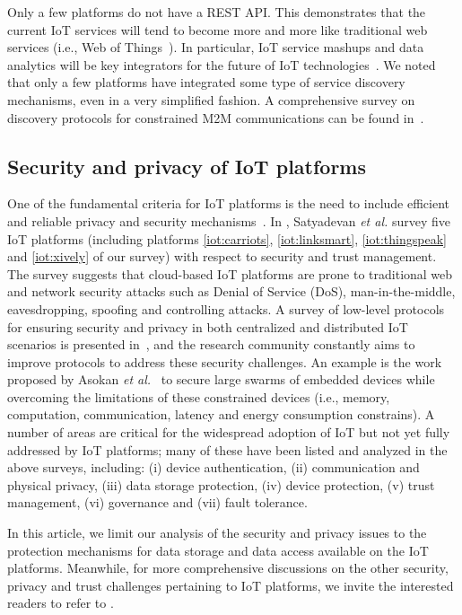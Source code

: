 \documentclass[preprint,10pt,5p]{elsarticle}
\begin{document}
Only a few platforms do not have a REST API. This demonstrates that
the current IoT services will tend to become more and more like
traditional web services (i.e., Web of Things~\cite{Perez2014}). 
In particular, IoT service mashups and data
analytics will be key integrators for the future of IoT
technologies~\cite{Qin2011,Ma2013,Tsai2014}. We noted that only a few
platforms have integrated some type of service discovery mechanisms,
even in a very simplified fashion.
A comprehensive survey on discovery protocols for constrained M2M
communications can be found in~\cite{Villaverde2014}.

\subsection*{Security and privacy of IoT platforms}
One of the fundamental criteria for IoT platforms is the need to
include efficient and reliable privacy and security
mechanisms~\cite{Yan2014,Roman2011,Zhang2014,Roman2013,Satyadevan2015}.
In \cite{Satyadevan2015}, Satyadevan \textit{et al.} survey five IoT
platforms (including platforms \ref{iot:carriots},
\ref{iot:linksmart}, \ref{iot:thingspeak} and \ref{iot:xively} of our
survey) with respect to security and trust management.
The survey suggests that cloud-based IoT platforms are prone to
traditional web and network security attacks such as Denial of Service
(DoS), man-in-the-middle, eavesdropping, spoofing and controlling
attacks. 
A survey of low-level protocols for ensuring security and privacy in both
centralized and distributed IoT scenarios is presented in~\cite{Roman2013},
and the research community constantly aims to improve protocols to address these 
security challenges. An example is the work proposed by Asokan \textit{et
  al.}~\cite{Asokan2015} to secure large swarms of embedded devices
while overcoming the limitations of these constrained devices (i.e.,
memory, computation, communication, latency and energy consumption
constrains). 
A number of areas are critical for the widespread adoption of IoT but not yet fully 
addressed by IoT platforms; many of these have been listed and analyzed in the above surveys, including: 
(i) device authentication, (ii) communication and physical privacy, 
(iii) data storage protection, (iv) device protection, (v) trust
management, (vi) governance and (vii) fault tolerance.

In this article, we limit our analysis of the security and privacy issues to the protection
mechanisms for data storage and data access
available on the IoT platforms. Meanwhile, for
more comprehensive discussions on the other security, privacy and trust
challenges pertaining to IoT platforms, we invite the interested readers
to refer to \cite{Zhang2014,Roman2013,Satyadevan2015,Asokan2015}.
\end{document}
